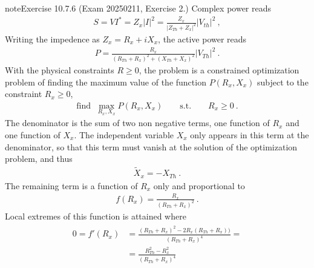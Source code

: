 \documentclass[letterpaper,10pt,italian]{jupyterBook}
\begin{document}
\begin{sphinxadmonition}{note}{Exercise 10.7.6 (Exam 2025\sphinxhyphen{}02\sphinxhyphen{}11, Exercise 2.)}
\sphinxAtStartPar
{} Complex power reads
\begin{equation*}
\begin{split}S = V I^* = Z_x |I|^2 = \frac{Z_x}{|Z_{Th} + Z_x|^2} |V_{th}|^2 \ ,\end{split}
\end{equation*}
\sphinxAtStartPar
Writing the impedence as \(Z_x = R_x + i X_x\), the active power reads
\begin{equation*}
\begin{split}P = \frac{ R_x }{ (R_{Th} + R_x)^2 + (X_{Th} + X_x)^2} |V_{Th}|^2 \ .\end{split}
\end{equation*}
\sphinxAtStartPar
With the physical constraints \(R \ge 0\), the problem is a constrained optimization problem of finding the maximum value of the function \(P(R_x, X_x)\) subject to the constraint \(R_x \ge 0\),
\begin{equation*}
\begin{split}\text{find } \ \max_{R_x, X_x} P(R_x, X_x) \qquad \text{s.t.} \qquad R_x \ge 0 \ .\end{split}
\end{equation*}
\sphinxAtStartPar
The denominator is the sum of two non negative terms, one function of \(R_x\) and one function of \(X_x\). The independent variable \(X_x\) only appears in this term at the denominator, so that this term must vanish at the solution of the optimization problem, and thus
\begin{equation*}
\begin{split}\widetilde{X}_x = - X_{Th} \ .\end{split}
\end{equation*}
\sphinxAtStartPar
The remaining term is a function of \(R_x\) only and proportional to
\begin{equation*}
\begin{split}f(R_x) = \frac{R_x}{(R_{Th} + R_x)^2} \ .\end{split}
\end{equation*}
\sphinxAtStartPar
Local extremes of this function is attained where
\begin{equation*}
\begin{split}\begin{aligned}
  0 = f'(R_x) 
  & = \frac{(R_{Th} + R_x)^2 - 2 R_x (R_{Th} + R_x))}{(R_{Th} + R_x)^4} = \\
  & = \frac{R_{Th}^2 - R_x^2 }{(R_{Th} + R_x)^4} \\
\end{aligned}\end{split}

\end{equation*}
\end{sphinxadmonition}
\end{document}
